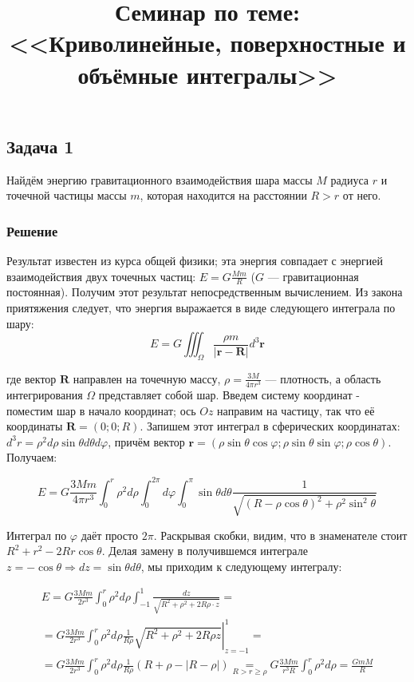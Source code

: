 \documentclass[a4paper,12pt]{article}
\begin{document}
\title{Семинар по теме: <<Криволинейные, поверхностные и объёмные интегралы>>}
\maketitle

\subsection*{Задача 1}

Найдём энергию гравитационного взаимодействия шара массы $M$ радиуса
$r$ и точечной частицы массы $m$, которая находится на расстоянии
$R>r$ от него.


\subsubsection*{Решение}

Результат известен из курса общей физики; эта энергия совпадает с
энергией взаимодействия двух точечных частиц: $E=G\frac{Mm}{R}$ ($G$
--- гравитационная постоянная). Получим этот результат непосредственным
вычислением. Из закона приятяжения следует, что энергия выражается
в виде следующего интеграла по шару:
\[
E=G\iiint_{\Omega}\frac{\rho m}{\left|\mathbf{r}-\mathbf{R}\right|}d^{3}\mathbf{r}
\]

 \noindent
где вектор $\mathbf{R}$ направлен на точечную массу, $\rho=\frac{3M}{4\pi r^{3}}$
--- плотность, а область интегрирования $\Omega$ представляет собой
шар. Введем систему координат - поместим шар в начало координат; ось
$Oz$ направим на частицу, так что её координаты $\mathbf{R}=(0;0;R)$.
Запишем этот интеграл в сферических координатах: $d^{3}r=\rho^{2}d\rho\sin\theta d\theta d\varphi$,
причём вектор $\mathbf{r}=\left(\rho\sin\theta\cos\varphi;\rho\sin\theta\sin\varphi;\rho\cos\theta\right)$.
Получаем:

\[
E=G\frac{3Mm}{4\pi r^{3}}\int_{0}^{r}\rho^{2}d\rho\int_{0}^{2\pi}d\varphi\int_{0}^{\pi}\sin\theta d\theta\frac{1}{\sqrt{(R-\rho\cos\theta)^{2}+\rho^{2}\sin^{2}\theta}}
\]

 \noindent
Интеграл по $\varphi$ даёт просто $2\pi$. Раскрывая скобки, видим,
что в знаменателе стоит $R^{2}+r^{2}-2Rr\cos\theta$. Делая замену
в получившемся интеграле $z=-\cos\theta\Rightarrow dz=\sin\theta d\theta$,
мы приходим к следующему интегралу:

\begin{multline*}
E=G\frac{3Mm}{2r^{3}}\int_{0}^{r}\rho^{2}d\rho\int_{-1}^{1}\frac{dz}{\sqrt{R^{2}+\rho^{2}+2R\rho\cdot z}}=\\
=G\frac{3Mm}{2r^{3}}\int_{0}^{r}\rho^{2}d\rho\frac{1}{R\rho}\left.\sqrt{R^{2}+\rho^{2}+2R\rho z}\right|_{z=-1}^{1}=\\
=G\frac{3Mm}{2r^{3}}\int_{0}^{r}\rho^{2}d\rho\frac{1}{R\rho}(R+\rho-|R-\rho|)\underset{R>r\geq\rho}{=}G\frac{3Mm}{r^{3}R}\int_{0}^{r}\rho^{2}d\rho=\frac{GmM}{R}
\end{multline*}
\end{document}
